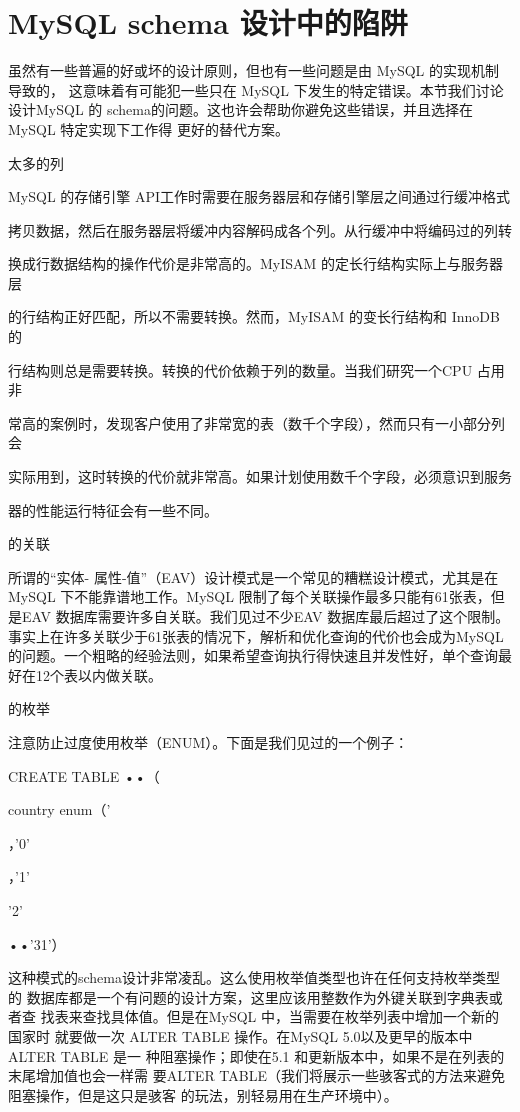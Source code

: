 \section{MySQL schema 设计中的陷阱}
虽然有一些普遍的好或坏的设计原则，但也有一些问题是由 MySQL 的实现机制导致的，
这意味着有可能犯一些只在 MySQL 下发生的特定错误。本节我们讨论设计MySQL 的
schema的问题。这也许会帮助你避免这些错误，并且选择在MySQL 特定实现下工作得
更好的替代方案。

太多的列

MySQL 的存储引擎 API工作时需要在服务器层和存储引擎层之间通过行缓冲格式

拷贝数据，然后在服务器层将缓冲内容解码成各个列。从行缓冲中将编码过的列转

换成行数据结构的操作代价是非常高的。MyISAM 的定长行结构实际上与服务器层

的行结构正好匹配，所以不需要转换。然而，MyISAM 的变长行结构和 InnoDB 的

行结构则总是需要转换。转换的代价依赖于列的数量。当我们研究一个CPU 占用非

常高的案例时，发现客户使用了非常宽的表（数千个字段），然而只有一小部分列会

实际用到，这时转换的代价就非常高。如果计划使用数千个字段，必须意识到服务

器的性能运行特征会有一些不同。

的关联

所谓的“实体- 属性-值”（EAV）设计模式是一个常见的糟糕设计模式，尤其是在
MySQL 下不能靠谱地工作。MySQL 限制了每个关联操作最多只能有61张表，但
是EAV 数据库需要许多自关联。我们见过不少EAV 数据库最后超过了这个限制。
事实上在许多关联少于61张表的情况下，解析和优化查询的代价也会成为MySQL
的问题。一个粗略的经验法则，如果希望查询执行得快速且并发性好，单个查询最
好在12个表以内做关联。

的枚举

注意防止过度使用枚举（ENUM）。下面是我们见过的一个例子：

CREATE TABLE ••（

country enum（'

，'0'

，'1'

'2'

••'31'）

这种模式的schema设计非常凌乱。这么使用枚举值类型也许在任何支持枚举类型的
数据库都是一个有问题的设计方案，这里应该用整数作为外键关联到字典表或者查
找表来查找具体值。但是在MySQL 中，当需要在枚举列表中增加一个新的国家时
就要做一次 ALTER TABLE 操作。在MySQL 5.0以及更早的版本中 ALTER TABLE 是一
种阻塞操作；即使在5.1 和更新版本中，如果不是在列表的末尾增加值也会一样需
要ALTER TABLE（我们将展示一些骇客式的方法来避免阻塞操作，但是这只是骇客
的玩法，别轻易用在生产环境中）。

